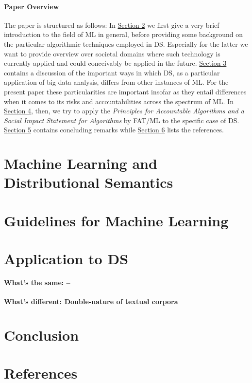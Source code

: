 \documentclass{article}
\begin{document}
\paragraph{Paper Overview}
The paper is structured as follows: In \hyperlink{sec2}{Section 2} we first give a very brief introduction to the field of ML in general, before providing some background on the particular algorithmic techniques employed in DS. Especially for the latter we want to provide overview over societal domains where such technology is currently applied and could conceivably be applied in the future. \hyperlink{sec3}{Section 3} contains a discussion of the important ways in which DS, as a particular application of big data analysis, differs from other instances of ML. For the present paper these particularities are important insofar as they entail differences when it comes to its risks and accountabilities across the spectrum of ML. In \hyperlink{sec4}{Section 4}, then, we try to apply the \emph{Principles for Accountable Algorithms and a Social Impact Statement for Algorithms} by FAT/ML to the specific case of DS. \hyperlink{sec5}{Section 5} contains concluding remarks while \hyperlink{sec6}{Section 6} lists the references.
\section{Machine Learning and Distributional Semantics}\hypertarget{sec3}{ }

\section{Guidelines for Machine Learning}\hypertarget{sec2}{}

\section{Application to DS}\hypertarget{sec4}{ }
\paragraph{What's the same: --}
\paragraph{What's different: Double-nature of textual corpora}
\section{Conclusion}

\section{References}\hypertarget{sec5}{ }
\end{document}
